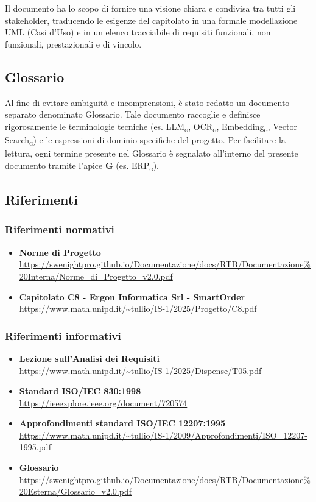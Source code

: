 \documentclass[a4paper, 11pt, oneside]{scrartcl} %
\begin{document}
Il documento ha lo scopo di fornire una visione chiara e condivisa tra tutti gli stakeholder, traducendo le esigenze del capitolato in una formale modellazione UML (Casi d'Uso) e in un elenco tracciabile di requisiti funzionali, non funzionali, prestazionali e di vincolo.

\subsection{Glossario}
Al fine di evitare ambiguità e incomprensioni, è stato redatto un documento separato denominato Glossario. Tale documento raccoglie e definisce rigorosamente le terminologie tecniche (es. LLM\textsubscript{\textsc{g}}, OCR\textsubscript{\textsc{g}}, Embedding\textsubscript{\textsc{g}}, Vector Search\textsubscript{\textsc{g}}) e le espressioni di dominio specifiche del progetto.
Per facilitare la lettura, ogni termine presente nel Glossario è segnalato all'interno del presente documento tramite l'apice \textbf{G} (es. ERP\textsubscript{\textsc{g}}).

\subsection{Riferimenti}
\subsubsection{Riferimenti normativi}
\begin{itemize}
    \item \textbf{Norme di Progetto} \\
          \url{https://swenightpro.github.io/Documentazione/docs/RTB/Documentazione%20Interna/Norme_di_Progetto_v2.0.pdf}
    \item \textbf{Capitolato C8 - Ergon Informatica Srl - SmartOrder} \\
          \url{https://www.math.unipd.it/~tullio/IS-1/2025/Progetto/C8.pdf}
\end{itemize}

\subsubsection{Riferimenti informativi}
\begin{itemize}
    \item \textbf{Lezione sull’Analisi dei Requisiti} \\
          \url{https://www.math.unipd.it/~tullio/IS-1/2025/Dispense/T05.pdf}
    \item \textbf{Standard ISO/IEC 830:1998} \\
          \url{https://ieeexplore.ieee.org/document/720574}
    \item \textbf{Approfondimenti standard ISO/IEC 12207:1995} \\
          \url{https://www.math.unipd.it/~tullio/IS-1/2009/Approfondimenti/ISO_12207-1995.pdf}
    \item \textbf{Glossario} \\
          \url{https://swenightpro.github.io/Documentazione/docs/RTB/Documentazione%20Esterna/Glossario_v2.0.pdf}
\end{itemize}
\end{document}
